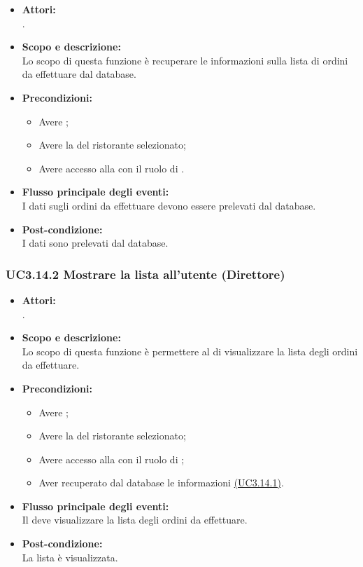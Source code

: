 \begin{itemize}
	\item \textbf{Attori:}
	\\.
	\item \textbf{Scopo e descrizione:} 
	\\Lo scopo di questa funzione è recuperare le informazioni sulla lista di ordini da effettuare dal database.
	\item \textbf{Precondizioni:}
	\begin{itemize}
		\item Avere ;
		\item Avere la  del ristorante selezionato;
		\item Avere accesso alla  con il ruolo di .
	\end{itemize}
	\item \textbf{Flusso principale degli eventi:}
	\\I dati sugli ordini da effettuare devono essere prelevati dal database.
	\item \textbf{Post-condizione:}
	\\I dati sono prelevati dal database.
\end{itemize}

\subsubsection{UC3.14.2 Mostrare la lista all'utente (Direttore)} \label{UC3.14.2}

\begin{itemize}
	\item \textbf{Attori:}
	\\.
	\item \textbf{Scopo e descrizione:} 
	\\Lo scopo di questa funzione è permettere al  di visualizzare la lista degli ordini da effettuare.
	\item \textbf{Precondizioni:}
	\begin{itemize}
		\item Avere ;
		\item Avere la  del ristorante selezionato;
		\item Avere accesso alla  con il ruolo di ;
		\item Aver recuperato dal database le informazioni \hyperref[UC3.14.1]{(UC3.14.1)}.
	\end{itemize}
	\item \textbf{Flusso principale degli eventi:}
	\\Il {} deve visualizzare la lista degli ordini da effettuare.
	\item \textbf{Post-condizione:}
	\\La lista è visualizzata.
\end{itemize}

